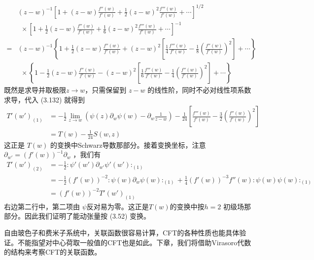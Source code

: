 \begin{equation*}
	\begin{aligned} &(z-w)^{-1}\left[ 1+(z-w)\frac{f''(w)}{f'(w)}+\frac{1}{2}(z-w)^2\frac{f'''(w)}{f'(w)}+\cdots\right]^{1/2}\\ &\ \ \times \left[ 1+\frac{1}{2} (z-w)\frac{f''(w)}{f'(w)}+\frac{1}{6}(z-w)^2\frac{f'''(w)}{f'(w)}+\cdots\right]^{-1}\\= &(z-w)^{-1}\left\{ 1+\frac{1}{2}(z-w)\frac{f''(w)}{f'(w)}+(z-w)^2\left[\frac{1}{4}\frac{f'''(w)}{f'(w)}-\frac{1}{8}\left(\frac{f''(w)}{f'(w)} \right)^2\right]+\cdots\right\}\\ &\ \ \times \left\{1- \frac{1}{2} (z-w)\frac{f''(w)}{f'(w)}-(z-w)^2\left[\frac{1}{6}\frac{f'''(w)}{f'(w)}-\frac{1}{4}\left(\frac{f''(w)}{f'(w)} \right)^2\right]+\cdots\right\} \end{aligned}
\end{equation*}
既然是求导并取极限$ z\to w $，只需保留到 $z-w$ 的线性阶，同时不必对线性项系数求导，代入 (3.132) 就得到
\begin{equation}
	\begin{aligned} T'(w')_{(1)}&=-\frac{1}{2}\lim _{z \rightarrow w}\left(\psi\left(z\right) \partial_{w} \psi\left(w\right)-\partial_w\frac{1}{z-w}\right)-\frac{1}{24}\left[ \frac{f'''(w)}{f'(w)}-\frac{3}{2}\left(\frac{f''(w)}{f'(w)}\right)^2\right]\\&=T(w)-\frac{1}{24}S(w,z) \end{aligned}
\end{equation}
这正是 $T(w)$ 的变换中Schwarz导数那部分。接着变换坐标，注意 $\partial_{w'}=(f'(w))^{-1}\partial_w$ ，我们有
\begin{equation}
	\begin{aligned} T'(w')_{(2)}&=-\frac{1}{2}:\psi'(w')\partial_{w'} \psi'(w') :_{(1)}\\ &=-\frac{1}{2}(f'(w))^{-2}:\psi(w)\partial_w\psi(w):_{(1)}+\frac{1}{4}(f'(w))^{-3}f''(w):\psi(w)\psi(w): _{(1)}\\&=(f'(w))^{-2}T'(w')_{(1)} \end{aligned}
\end{equation}
右边第二行中，第二项由 $\psi $反对易为零。这正是$ T(w) $的变换中按$ h=2$ 初级场那部分。因此我们证明了能动张量按 (3.52) 变换。

自由玻色子和费米子系统中，关联函数很容易计算，CFT的各种性质也能具体验证。不能指望对中心荷取一般值的CFT也是如此。下章，我们将借助Virasoro代数的结构来考察CFT的关联函数。




